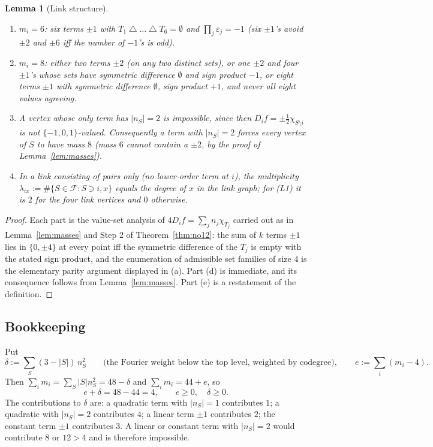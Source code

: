 \documentclass[11pt,reqno]{amsart}
\theoremstyle{plain}
\newtheorem{lemma}[theorem]{Lemma}
\theoremstyle{definition}
\numberwithin{theorem}{section}
\newcommand{\bits}{\{-1,0,1\}}
\newcommand{\sd}{\mathbin{\triangle}}
\newcommand{\eps}{\varepsilon}
\begin{document}
\begin{lemma}[Link structure]
\begin{enumerate}[label=\textup{(\alph*)}]
  is (L4), a $C_4$ having no triangle.
  \item \textbf{$m_i = 6$}: six terms $\pm1$ with $T_1 \sd \dots \sd T_6 = \emptyset$ and
  $\prod_j \eps_j = -1$ (six $\pm1$'s avoid $\pm2$ and $\pm6$ iff the number of $-1$'s is odd).
  \item \textbf{$m_i = 8$}: either two terms $\pm2$ (on any two distinct sets), or one $\pm2$ and
  four $\pm1$'s whose sets have symmetric difference $\emptyset$ and sign product $-1$, or eight
  terms $\pm1$ with symmetric difference $\emptyset$, sign product $+1$, and never all eight
  values agreeing.
  \item A vertex whose only term has $|n_S| = 2$ is impossible, since then
  $D_i f = \pm\frac12\chi_{S \setminus i}$ is not $\bits$-valued. Consequently a term with
  $|n_S| = 2$ forces every vertex of $S$ to have mass $8$ (mass $6$ cannot contain a $\pm2$, by
  the proof of Lemma~\ref{lem:masses}).
  \item In a link consisting of pairs only (no lower-order term at $i$), the multiplicity
  $\lambda_{ix} := \#\{S \in \mathcal{F} : S \ni i, x\}$ equals the degree of $x$ in the link
  graph; for (L1) it is $2$ for the four link vertices and $0$ otherwise.
\end{enumerate}
\end{lemma}

\begin{proof}
Each part is the value-set analysis of $4D_i f = \sum_j n_j \chi_{T_j}$ carried out as in
Lemma~\ref{lem:masses} and Step 2 of Theorem~\ref{thm:no12}: the sum of $k$ terms $\pm1$ lies in
$\{0,\pm4\}$ at every point iff the symmetric difference of the $T_j$ is empty with the stated
sign product, and the enumeration of admissible set families of size $4$ is the elementary
parity argument displayed in (a). Part (d) is immediate, and its consequence follows from
Lemma~\ref{lem:masses}. Part (e) is a restatement of the definition.
\end{proof}

\subsection{Bookkeeping}\label{sec:bookkeep}
Put
\[
  \delta := \sum_S (3 - |S|)\, n_S^2 \qquad\text{(the Fourier weight below the top level,
  weighted by codegree)}, \qquad e := \sum_{i} (m_i - 4).
\]
Then $\sum_i m_i = \sum_S |S| n_S^2 = 48 - \delta$ and $\sum_i m_i = 44 + e$, so
\begin{equation}\label{eq:bookkeeping}
  e + \delta = 48 - 44 = 4, \qquad e \ge 0, \quad \delta \ge 0 .
\end{equation}
The contributions to $\delta$ are: a quadratic term with $|n_S| = 1$ contributes $1$; a
quadratic with $|n_S| = 2$ contributes $4$; a linear term $\pm1$ contributes $2$; the constant
term $\pm1$ contributes $3$. A linear or constant term with $|n_S| = 2$ would contribute $8$ or
$12 > 4$ and is therefore impossible.
\end{document}
